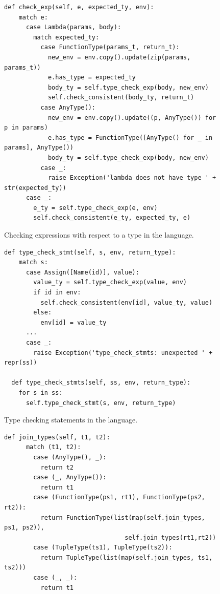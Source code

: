 \documentclass[7x10]{TimesAPriori_MIT}%
\numberwithin{theorem}{chapter}
\numberwithin{definition}{chapter}
\numberwithin{equation}{chapter}
\begin{document}
{\begin{figure}[tbp]
\begin{tcolorbox}[colback=white]  
\begin{lstlisting}[basicstyle=\ttfamily\footnotesize]
  def check_exp(self, e, expected_ty, env):
    match e:
      case Lambda(params, body):
        match expected_ty:
          case FunctionType(params_t, return_t):
            new_env = env.copy().update(zip(params, params_t))
            e.has_type = expected_ty
            body_ty = self.type_check_exp(body, new_env)
            self.check_consistent(body_ty, return_t)
          case AnyType():
            new_env = env.copy().update((p, AnyType()) for p in params)
            e.has_type = FunctionType([AnyType() for _ in params], AnyType())
            body_ty = self.type_check_exp(body, new_env)
          case _:
            raise Exception('lambda does not have type ' + str(expected_ty))
      case _:
        e_ty = self.type_check_exp(e, env)
        self.check_consistent(e_ty, expected_ty, e)
\end{lstlisting}
\end{tcolorbox}
\caption{Checking expressions with respect to a type in the \LangGrad{} language.}
\label{fig:type-check-Lgradual-2}
\end{figure}

\begin{figure}[tbp]
\begin{tcolorbox}[colback=white]
\begin{lstlisting}[basicstyle=\ttfamily\footnotesize]
  def type_check_stmt(self, s, env, return_type):
    match s:
      case Assign([Name(id)], value):
        value_ty = self.type_check_exp(value, env)
        if id in env:
          self.check_consistent(env[id], value_ty, value)
        else:
          env[id] = value_ty
      ...
      case _:
        raise Exception('type_check_stmts: unexpected ' + repr(ss))

  def type_check_stmts(self, ss, env, return_type):
    for s in ss:
      self.type_check_stmt(s, env, return_type)
\end{lstlisting}
\end{tcolorbox}
\caption{Type checking statements in the \LangGrad{} language.}
\label{fig:type-check-Lgradual-3}
\end{figure}

\begin{figure}[tbp]
\begin{tcolorbox}[colback=white]  
\begin{lstlisting}[basicstyle=\ttfamily\scriptsize]
  def join_types(self, t1, t2):
      match (t1, t2):
        case (AnyType(), _):
          return t2
        case (_, AnyType()):
          return t1
        case (FunctionType(ps1, rt1), FunctionType(ps2, rt2)):
          return FunctionType(list(map(self.join_types, ps1, ps2)),
                                 self.join_types(rt1,rt2))
        case (TupleType(ts1), TupleType(ts2)):
          return TupleType(list(map(self.join_types, ts1, ts2)))
        case (_, _):
          return t1
        

\end{lstlisting}
\end{tcolorbox}
\end{figure}}
\end{document}
